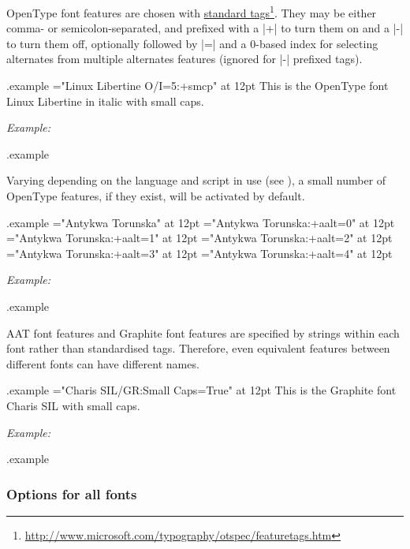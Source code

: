 \documentclass[12pt]{article}
\edef\examplefilename{\jobname.example}
\newlength\exampleindent
\newenvironment{example}
  {\VerbatimEnvironment
   \begin{VerbatimOut}{\examplefilename}}
  {\end{VerbatimOut}
   \typesetexample}
\newcommand\typesetexample{%
  \begin{trivlist}\item[]
  \vrule
  \hspace{\exampleindent}
  \begin{minipage}{\linewidth-\exampleindent-\exampleindent}
    \textit{Example:}\par
    \vspace{0.4\baselineskip}
    \BVerbatimInput[fontsize=\small]{\examplefilename}\par
    \vspace{0.4\baselineskip}
    \color[rgb]{0.7,0,0}\examplefilename\relax
  \end{minipage}\par
  \end{trivlist}}
\newcommand\hlink[2]{\href{#1}{#2}\footnote{\url{#1}}}
\begin{document}
OpenType font features are chosen with
\hlink{http://www.microsoft.com/typography/otspec/featuretags.htm}{standard
tags}. They may be either comma- or semicolon-separated, and prefixed
with a |+| to turn them on and a |-| to turn them off, optionally followed
by |=| and a 0-based index for selecting alternates from multiple
alternates features (ignored for |-| prefixed tags).

\begin{example}
\font\liber="Linux Libertine O/I=5:+smcp" at 12pt
\liber This is the OpenType font Linux Libertine in italic with small caps.
\end{example}

Varying depending on the language and script in use (see
), a small number of OpenType features, if they
exist, will be activated by default.

\begin{example}
\font\antt="Antykwa Torunska"         at 12pt 
\font\antt="Antykwa Torunska:+aalt=0" at 12pt 
\font\antt="Antykwa Torunska:+aalt=1" at 12pt 
\font\antt="Antykwa Torunska:+aalt=2" at 12pt 
\font\antt="Antykwa Torunska:+aalt=3" at 12pt 
\font\antt="Antykwa Torunska:+aalt=4" at 12pt 
\end{example}

AAT font features and Graphite font features are specified by strings
within each font rather than standardised tags. Therefore, even
equivalent features between different fonts can have different names.

\begin{example}
\font\gra="Charis SIL/GR:Small Caps=True" at 12pt
\gra This is the Graphite font Charis SIL with small caps.
\end{example}

\subsubsection{Options for all fonts}
\end{document}
